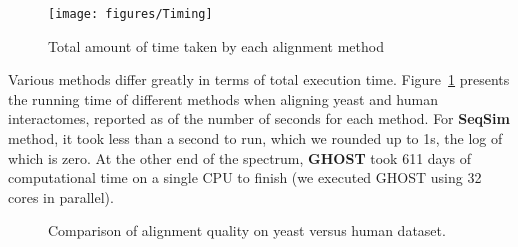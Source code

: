 \documentclass[10pt, journal, compsoc, final]{IEEEtran}
\begin{document}
\begin{figure}[!h]
\texttt{[image: figures/Timing]}
\caption{Total amount of time taken by each alignment method}
\label{fig:timing}
\end{figure}


Various methods differ greatly in terms of total execution time. Figure~\ref{fig:timing} presents the running time of different methods when aligning yeast and human interactomes, reported as  of the number of seconds for each method. For \textbf{SeqSim} method, it took less than a second to run, which we rounded up to 1s, the log of which is zero. At the other end of the spectrum, \textbf{GHOST} took 611 days of computational time on a single CPU to finish (we executed GHOST using 32 cores in parallel). 




\begin{figure*}[!t]
\centering
\hfil {}\hfil {}\hfil
 \hfil
 \caption{Comparison of alignment quality on yeast versus human dataset.}
 \label{fig:SCvsHS_validation}
\end{figure*}
\end{document}
